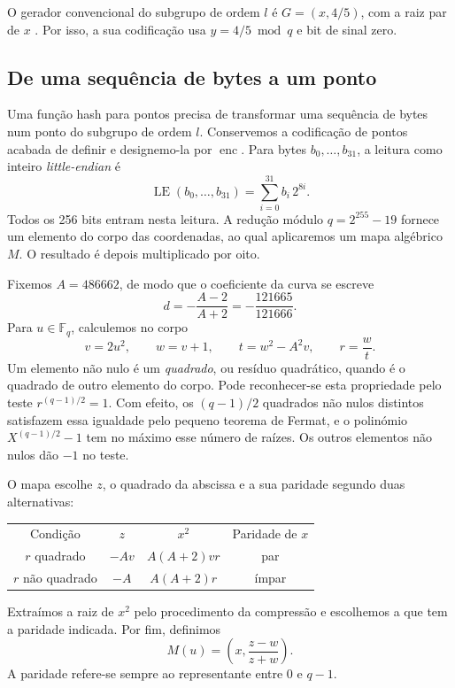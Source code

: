 O gerador convencional do subgrupo de ordem \(l\) é
\(G=(x,4/5)\), com a raiz par de \(x\) \cite{Bernstein2012}. Por isso, a sua
codificação usa \(y=4/5\bmod q\) e bit de sinal zero.


\subsection{De uma sequência de bytes a um ponto}
\label{subsec:hash-to-point}

Uma função hash para pontos precisa de transformar uma sequência de bytes
num ponto do subgrupo de ordem \(l\). Conservemos a codificação de pontos
acabada de definir e designemo-la por \(\operatorname{enc}\).
Para bytes \(b_0,\ldots,b_{31}\), a leitura como inteiro
\emph{little-endian} é
\[
 \operatorname{LE}(b_0,\ldots,b_{31})
     =\sum_{i=0}^{31}b_i\,2^{8i}.
\]
Todos os 256 bits entram nesta leitura. A redução módulo \(q=2^{255}-19\)
fornece um elemento do corpo das coordenadas, ao qual aplicaremos um mapa
algébrico \(M\). O resultado é depois multiplicado por oito.

Fixemos \(A=486662\), de modo que o coeficiente da curva se escreve
\[
 d=-\frac{A-2}{A+2}=-\frac{121665}{121666}.
\]
Para \(u\in\mathbb F_q\), calculemos no corpo
\[
 v=2u^2,\qquad w=v+1,\qquad t=w^2-A^2v,\qquad r=\frac wt.
\]
Um elemento não nulo é um \emph{quadrado}, ou resíduo quadrático, quando
é o quadrado de outro elemento do corpo. Pode reconhecer-se esta
propriedade pelo teste \(r^{(q-1)/2}=1\). Com efeito, os
\((q-1)/2\) quadrados não nulos distintos satisfazem essa igualdade
pelo pequeno teorema de Fermat, e o polinómio
\(X^{(q-1)/2}-1\) tem no máximo esse número de raízes.
Os outros elementos não nulos dão \(-1\) no teste.

O mapa escolhe \(z\), o quadrado da abscissa e a sua paridade segundo
duas alternativas:
\begin{center}
\begin{tabular}{c|c|c|c}
Condição & \(z\) & \(x^2\) & Paridade de \(x\)\\[1mm]
\(r\) quadrado & \(-Av\) & \(A(A+2)vr\) & par\\
\(r\) não quadrado & \(-A\) & \(A(A+2)r\) & ímpar
\end{tabular}
\end{center}
Extraímos a raiz de \(x^2\) pelo procedimento da compressão e escolhemos
a que tem a paridade indicada. Por fim, definimos
\begin{equation}
 M(u)=\left(x,\frac{z-w}{z+w}\right).
 \label{eq:hash-to-point-map}
\end{equation}
A paridade refere-se sempre ao representante entre \(0\) e \(q-1\).

